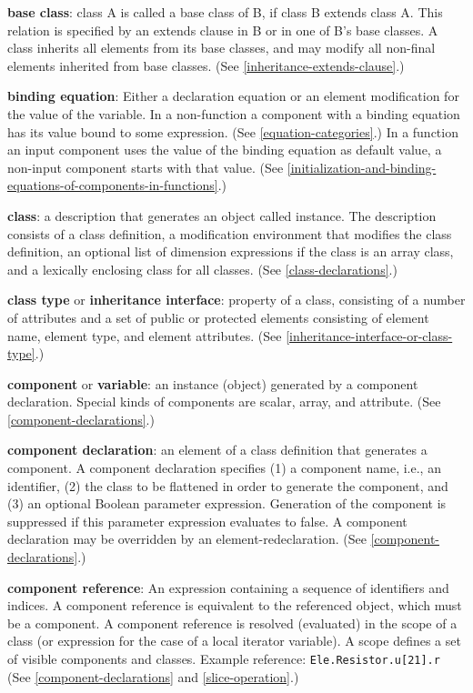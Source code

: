 \textbf{base class}: class A is called a base class of B, if class B
extends class A. This relation is specified by an extends clause in B or
in one of B's base classes. A class inherits all elements from its base
classes, and may modify all non-final elements inherited from base
classes. (See \autoref{inheritance-extends-clause}.)

\textbf{binding equation}: Either a declaration equation or an element
modification for the value of the variable. In a non-function a component with a binding
equation has its value bound to some expression. (See \autoref{equation-categories}.)
In a function an input component uses the value of the binding equation as default value,
a non-input component starts with that value.
(See \autoref{initialization-and-binding-equations-of-components-in-functions}.)

\textbf{class}: a description that generates an object called instance.
The description consists of a class definition, a modification
environment that modifies the class definition, an optional list of
dimension expressions if the class is an array class, and a lexically
enclosing class for all classes. (See \autoref{class-declarations}.)

\textbf{class type} or \textbf{inheritance interface}: property of a
class, consisting of a number of attributes and a set of public or
protected elements consisting of element name, element type, and element
attributes. (See \autoref{inheritance-interface-or-class-type}.)

\textbf{component} or \textbf{variable}: an instance (object) generated
by a component declaration. Special kinds of components are scalar,
array, and attribute. (See \autoref{component-declarations}.)

\textbf{component declaration}: an element of a class definition that
generates a component. A component declaration specifies (1) a component
name, i.e., an identifier, (2) the class to be flattened in order to
generate the component, and (3) an optional Boolean parameter
expression. Generation of the component is suppressed if this parameter
expression evaluates to false. A component declaration may be overridden
by an element-redeclaration. (See \autoref{component-declarations}.)

\textbf{component reference}: An expression containing a sequence of
identifiers and indices. A component reference is equivalent to the
referenced object, which must be a component. A component reference is
resolved (evaluated) in the scope of a class (or expression for the case
of a local iterator variable). A scope defines a set of visible
  components and classes. Example reference: \lstinline!Ele.Resistor.u[21].r! (See
\autoref{component-declarations} and \autoref{slice-operation}.)

